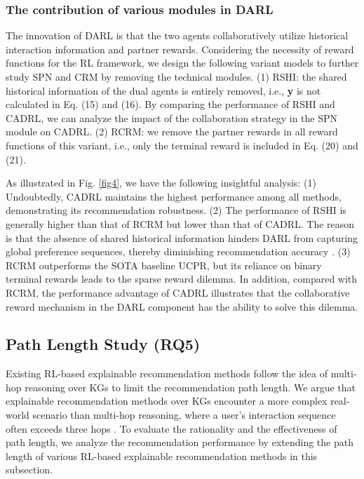 \documentclass[conference]{IEEEtran}
\begin{document}
\subsubsection{The contribution of various modules in DARL}


The innovation of DARL is that the two agents collaboratively utilize historical interaction information and  partner rewards. Considering the necessity of reward functions for the RL framework, we design the following variant models to further study SPN and CRM by removing the technical modules.  (1) RSHI: the shared historical information of the dual agents is entirely removed, i.e., \textbf{y} is not calculated in Eq. (15) and (16). By comparing the performance of RSHI and CADRL, we can analyze the impact of the collaboration strategy in the SPN module on CADRL.  (2) RCRM: we remove the partner rewards in all reward functions of this variant, i.e., only the terminal reward is included in Eq. (20) and (21). 


As illustrated in Fig. \ref{fig4}, we have the following insightful analysis: (1) Undoubtedly, CADRL maintains the highest performance among all methods, demonstrating its recommendation robustness. (2) The performance of RSHI is generally higher than that of RCRM but lower than that of CADRL. The reason is that the absence of shared historical information hinders DARL from capturing global preference sequences, thereby diminishing recommendation accuracy  \cite{PGPR}. (3) %
 RCRM outperforms the SOTA baseline UCPR, but its reliance on binary terminal rewards leads to the sparse reward dilemma. In addition, compared with RCRM, the performance advantage of CADRL illustrates that the collaborative reward mechanism in the DARL component has the ability to solve this dilemma. 


\subsection{Path Length Study (RQ5)}
Existing RL-based explainable recommendation methods follow the idea of multi-hop reasoning over KGs \cite{KGzsf} \cite{multihopKGR} to limit  the recommendation path length. We argue that explainable recommendation methods over KGs encounter a more complex real-world scenario than multi-hop reasoning, where a user’s interaction sequence often exceeds three hops \cite{longseq}. To evaluate the rationality and the effectiveness of path length, we analyze the recommendation performance by extending the path length of various RL-based explainable recommendation methods in this subsection.
\end{document}
